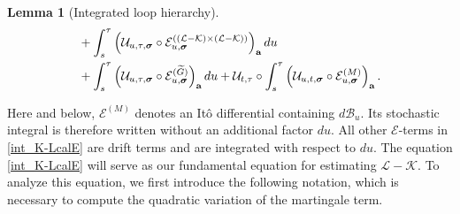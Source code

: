 \documentclass[10pt,reqno]{article}
\theoremstyle{plain} %
\newtheorem{lemma}[theorem]{Lemma}
\theoremstyle{remark}
\numberwithin{equation}{section}
\begin{document}
\begin{lemma}[Integrated loop hierarchy]
\begin{align}
    &+ \int_{s}^\tau \left(\mathcal{U}_{u, \tau, \boldsymbol{\sigma}} \circ \mathcal{E}^{((\mathcal{L} - \mathcal{K}) \times (\mathcal{L} - \mathcal{K}))}_{u, \boldsymbol{\sigma}}\right)_{\textbf{a}} du  \nonumber \\
    &+ \int_{s}^\tau \left(\mathcal{U}_{u, \tau, \boldsymbol{\sigma}} \circ \mathcal{E}^{(\widetilde{G})}_{u, \boldsymbol{\sigma}}\right)_{\textbf{a}} du + 
    {\cal U}_{t,\tau}\circ \int_{s}^\tau \left(\mathcal{U}_{u, t, \boldsymbol{\sigma}} \circ \mathcal{E}^{(M)}_{u, \boldsymbol{\sigma}}\right)_{\textbf{a}}
    .
\end{align}
  
 
\end{lemma}

Here and below, \(\mathcal E^{(M)}\) denotes an It\^o differential containing \(d\mathcal B_u\). Its stochastic integral is therefore written without an additional factor \(du\). All other \(\mathcal E\)-terms in \eqref{int_K-LcalE} are drift terms and are integrated with respect to \(du\).
The equation \eqref{int_K-LcalE} will serve as our fundamental equation for estimating $\mathcal{L} - \mathcal{K}$. To analyze this equation, we first introduce the following notation, which is necessary to compute the quadratic variation of the martingale term.
\end{document}

